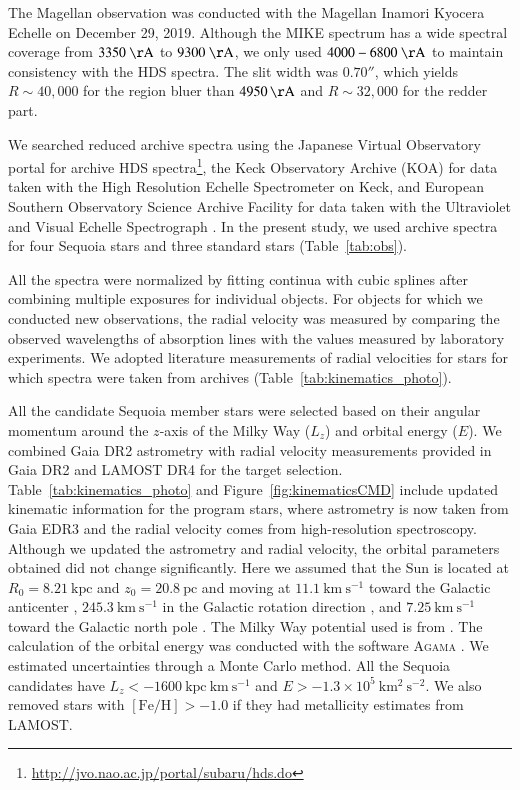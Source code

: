 \documentclass{aa}
\begin{document}
The Magellan observation was conducted with the Magellan Inamori Kyocera Echelle \citep[MIKE;][]{Bernstein2003a} on December 29, 2019.
Although the MIKE spectrum has a wide spectral coverage from $3350\ \mathrm{\AA}$ to $9300\ \mathrm{\AA}$, we only used $4000-6800\ \mathrm{\AA}$ to maintain consistency with the HDS spectra.
The slit width was $0.70''$, which yields $R\sim 40,000$ for the region bluer than $4950\,\mathrm{\AA}$ and $R\sim 32,000$ for the redder part.

We searched reduced archive spectra using the Japanese Virtual Observatory portal for archive HDS spectra\footnote{\url{http://jvo.nao.ac.jp/portal/subaru/hds.do}}, the Keck Observatory Archive (KOA) for data taken with the High Resolution Echelle Spectrometer \citep[HIRES;][]{Vogt1994} on Keck, and European Southern Observatory Science Archive Facility for data taken with the Ultraviolet and Visual Echelle Spectrograph \citep[UVES;][]{Dekker2000a}. 
In the present study, we used archive spectra for four Sequoia stars and three standard stars (Table~\ref{tab:obs}).

All the spectra were normalized by fitting continua with cubic splines after combining multiple exposures for individual objects.
For objects for which we conducted new observations, the radial velocity was measured by comparing the observed wavelengths of  absorption lines with the values measured by laboratory experiments.
We adopted literature measurements of radial velocities for stars for which spectra were taken from archives (Table~\ref{tab:kinematics_photo}).

All the candidate Sequoia member stars were selected based on their angular momentum around the $z$-axis of the Milky Way ($L_z$) and orbital energy ($E$).
We combined Gaia DR2 astrometry with radial velocity measurements provided in Gaia DR2 and LAMOST DR4 for the target selection.
Table~\ref{tab:kinematics_photo} and Figure~\ref{fig:kinematicsCMD} include updated kinematic information for the program stars, where astrometry is now taken from Gaia EDR3 and the radial velocity comes from high-resolution spectroscopy.
Although we updated the astrometry and radial velocity, the orbital parameters obtained did not change significantly.
Here we assumed that the Sun is located at $R_0=8.21\ \mathrm{kpc}$ \citep{McMillan2017a} and $z_0=20.8\ \mathrm{pc}$ \citep{Bennett2019a} and moving at $11.1\ \mathrm{km\ s^{-1}}$ toward the Galactic anticenter \citep{Schoenrich2010a}, $245.3\ \mathrm{km\ s^{-1}}$ in the Galactic rotation direction \citep{Reid2004a,McMillan2017a}, and $7.25\ \mathrm{km\ s^{-1}}$ toward the Galactic north pole \citep{Schoenrich2010a}.
The Milky Way potential used is from \citet{McMillan2017a}.
The calculation of the orbital energy was conducted with the software \textsc{Agama} \citep{Vasiliev2019a}.
We estimated uncertainties through a Monte Carlo method.
All the Sequoia candidates have $L_z<-1600\ \mathrm{kpc\ km\ s^{-1}}$ and $E>-1.3\times 10^5\ \mathrm{km^2\ s^{-2}}$.
We also removed stars with $[\mathrm{Fe/H}]>-1.0$ if they had metallicity estimates from LAMOST.
\end{document}
